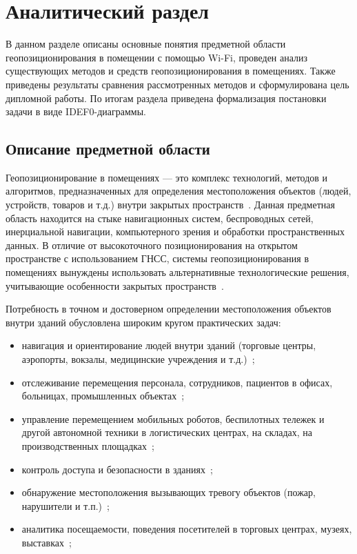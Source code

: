 \chapter{Аналитический раздел}

В данном разделе описаны основные понятия предметной области геопозиционирования в помещении с помощью Wi-Fi, проведен анализ существующих методов и средств геопозиционирования в помещениях. Также приведены результаты сравнения рассмотренных методов и сформулирована цель дипломной работы. По итогам раздела приведена формализация постановки задачи в виде IDEF0-диаграммы.

\section{Описание предметной области}

Геопозиционирование в помещениях --- это комплекс технологий, методов и алгоритмов, предназначенных для определения местоположения объектов (людей, устройств, товаров и т.д.) внутри закрытых пространств~\cite{basebook}. Данная предметная область находится на стыке навигационных систем, беспроводных сетей, инерциальной навигации, компьютерного зрения и обработки пространственных данных. В отличие от высокоточного позиционирования на открытом пространстве с использованием ГНСС, системы геопозиционирования в помещениях вынуждены использовать альтернативные технологические решения, учитывающие особенности закрытых пространств~\cite{vislight}.

Потребность в точном и достоверном определении местоположения объектов внутри зданий обусловлена широким кругом практических задач:

\begin{itemize}[label=---]
    \item навигация и ориентирование людей внутри зданий (торговые центры, аэропорты, вокзалы, медицинские учреждения и т.д.)~\cite{intro};
    \item отслеживание перемещения персонала, сотрудников, пациентов в офисах, больницах, промышленных объектах~\cite{staffpos};
    \item управление перемещением мобильных роботов, беспилотных тележек и другой автономной техники в логистических центрах, на складах, на производственных площадках~\cite{basebook};
    \item контроль доступа и безопасности в зданиях~\cite{accesscontrol};
    \item обнаружение местоположения вызывающих тревогу объектов (пожар, нарушители и т.п.)~\cite{trespassers};
    \item аналитика посещаемости, поведения посетителей в торговых центрах, музеях, выставках~\cite{occupancy};
\end{itemize}

